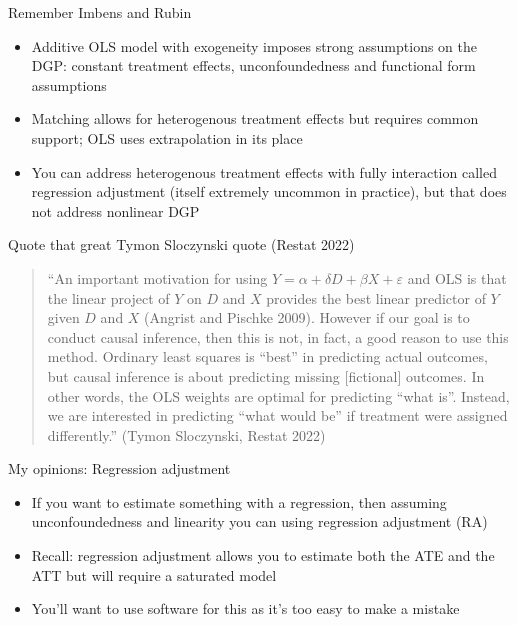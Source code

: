 \documentclass{beamer}
\begin{document}
\begin{frame}{Remember Imbens and Rubin}

\begin{itemize}

\item  Additive OLS model with exogeneity imposes strong assumptions on the DGP: constant treatment effects, unconfoundedness and functional form assumptions
\item Matching allows for heterogenous treatment effects but requires common support; OLS uses extrapolation in its place
\item You can address heterogenous treatment effects with fully interaction called regression adjustment (itself extremely uncommon in practice), but that does not address nonlinear DGP

\end{itemize}

\end{frame}

\begin{frame}{Quote that great Tymon Sloczynski quote (Restat 2022)}

\footnotesize
\begin{quote}
``An important motivation for using $Y=\alpha + \delta D + \beta X + \varepsilon$ and OLS is that the linear project of $Y$ on $D$ and $X$ provides the best linear predictor of $Y$ given $D$ and $X$ (Angrist and Pischke 2009). However if our goal is to conduct causal inference, then this is not, in fact, a good reason to use this method.  Ordinary least squares is ``best'' in predicting actual outcomes, but causal inference is about predicting missing [fictional] outcomes. In other words, the OLS weights are optimal for predicting ``what is''.  Instead, we are interested in predicting ``what would be'' if treatment were assigned differently.'' (Tymon Sloczynski, Restat 2022)
\end{quote}

\bigskip


\end{frame}


\begin{frame}{My opinions: Regression adjustment}

\begin{itemize}
\item If you want to estimate something with a regression, then assuming unconfoundedness and linearity you can using regression adjustment (RA)
\item Recall: regression adjustment allows you to estimate both the ATE and the ATT but will require a saturated model
\item You'll want to use software for this as it's too easy to make a mistake
\end{itemize}

\end{frame}
\end{document}
